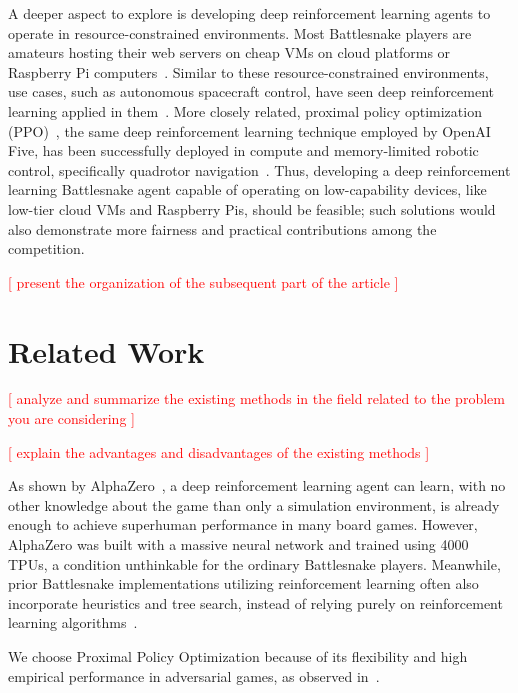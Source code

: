 \documentclass[conference]{IEEEtran}
\newcommand{\todo}[1]{\textcolor{red}{[ #1 ]}}
\begin{document}
A deeper aspect to explore is developing deep reinforcement learning agents to
operate in resource-constrained environments.
Most Battlesnake players are amateurs hosting their web servers on cheap VMs on
cloud platforms or Raspberry Pi computers~\cite{standard_leaderboard}.
Similar to these resource-constrained environments, use cases,
such as autonomous spacecraft control,
have seen deep reinforcement learning applied in
them~\cite{harris2022generation}. More closely related,
proximal policy optimization (PPO)~\cite{schulman2017proximal},
the same deep reinforcement learning technique employed by OpenAI Five,
has been successfully deployed in compute and memory-limited robotic control,
specifically quadrotor navigation~\cite{huang2023collision,hegde2023hyperppo}.
Thus,
developing a deep reinforcement learning Battlesnake agent capable of operating
on low-capability devices, like low-tier cloud VMs and Raspberry Pis,
should be feasible;
such solutions would also demonstrate more fairness and practical contributions
among the competition.

\todo{present the organization of the subsequent part of the article}

\section{Related Work}

\todo{analyze and summarize the existing methods in the field related to the
    problem you are considering
}

\todo{explain the advantages and disadvantages of the existing methods}

As shown by AlphaZero~\cite{silver2017mastering},
a deep reinforcement learning agent can learn,
with no other knowledge about the game than only a simulation environment,
is already enough to achieve superhuman performance in many board games.
However,
AlphaZero was built with a massive neural network and trained using 4000 TPUs,
a condition unthinkable for the ordinary Battlesnake players. Meanwhile,
prior Battlesnake implementations utilizing reinforcement learning often also
incorporate heuristics and tree search,
instead of relying purely on reinforcement learning
algorithms~\cite{chung2020battlesnake,binnersley2020battlesnake}.

We choose Proximal Policy Optimization because of its flexibility and high empirical performance in
adversarial games,
as observed
in~\cite{berner2019dota,binnersley2020battlesnake,chung2020battlesnake}.
\end{document}
